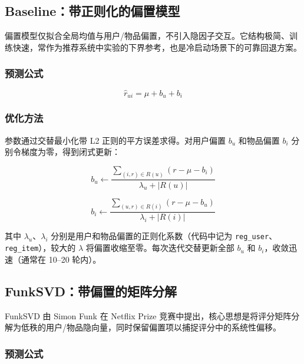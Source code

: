 \documentclass[UTF8,a4paper,10pt]{ctexart}
\begin{document}
\subsection{Baseline：带正则化的偏置模型}

偏置模型仅拟合全局均值与用户/物品偏置，不引入隐因子交互。它结构极简、训练快速，常作为推荐系统中实验的下界参考\cite{koren2009matrix}，也是冷启动场景下的可靠回退方案。

\subsubsection{预测公式}

\begin{equation}
    \hat{r}_{ui} = \mu + b_u + b_i
    \label{eq:baseline}
\end{equation}

\subsubsection{优化方法}

参数通过交替最小化带 L2 正则的平方误差求得。对用户偏置 $b_u$ 和物品偏置 $b_i$ 分别令梯度为零，得到闭式更新：

\begin{equation}
    b_u \leftarrow \frac{\sum_{(i,r) \in R(u)} (r - \mu - b_i)}{\lambda_u + |R(u)|}
    \label{eq:baseline_bu}
\end{equation}

\begin{equation}
    b_i \leftarrow \frac{\sum_{(u,r) \in R(i)} (r - \mu - b_u)}{\lambda_i + |R(i)|}
    \label{eq:baseline_bi}
\end{equation}

其中 $\lambda_u$、$\lambda_i$ 分别是用户和物品偏置的正则化系数（代码中记为 \texttt{reg\_user}、\texttt{reg\_item}），较大的 $\lambda$ 将偏置收缩至零。每次迭代交替更新全部 $b_u$ 和 $b_i$，收敛迅速（通常在 10--20 轮内）。

\subsection{FunkSVD：带偏置的矩阵分解}

FunkSVD 由 Simon Funk 在 Netflix Prize 竞赛中提出\cite{funk2006netflix}，核心思想是将评分矩阵分解为低秩的用户/物品隐向量，同时保留偏置项以捕捉评分中的系统性偏移。

\subsubsection{预测公式}
\end{document}
